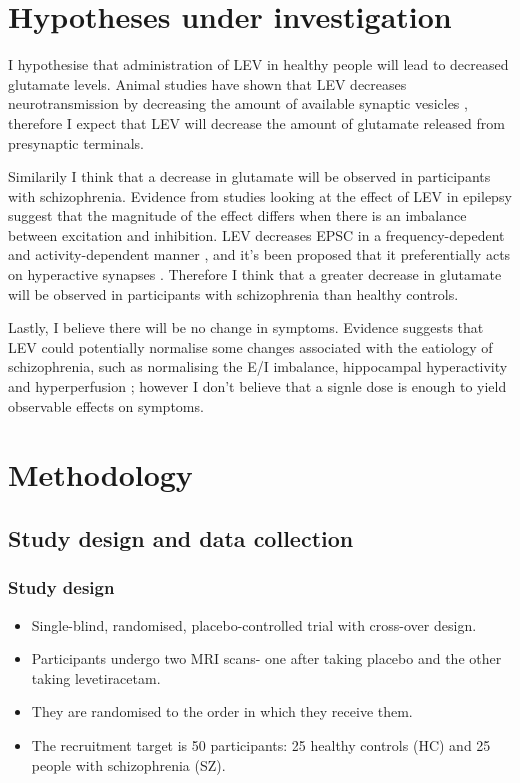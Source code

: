 \documentclass[
  letterpaper,
  DIV=11,
  numbers=noendperiod]{scrartcl}
\providecommand{\tightlist}{%
  \setlength{\itemsep}{0pt}\setlength{\parskip}{0pt}}\usepackage{longtable,booktabs,array}
\begin{document}
\section{Hypotheses under
investigation}\label{hypotheses-under-investigation}

I hypothesise that administration of LEV in healthy people will lead to
decreased glutamate levels. Animal studies have shown that LEV decreases
neurotransmission by decreasing the amount of available synaptic
vesicles \autocite{meehan_new_2011}, therefore I expect that LEV will
decrease the amount of glutamate released from presynaptic terminals.

Similarily I think that a decrease in glutamate will be observed in
participants with schizophrenia. Evidence from studies looking at the
effect of LEV in epilepsy suggest that the magnitude of the effect
differs when there is an imbalance between excitation and inhibition.
LEV decreases EPSC in a frequency-depedent and activity-dependent manner
\autocite{meehan_levetiracetam_2012}, and it's been proposed that it
preferentially acts on hyperactive synapses
\autocite{meehan_new_2011,loscher_synaptic_2016}. Therefore I think that
a greater decrease in glutamate will be observed in participants with
schizophrenia than healthy controls.

Lastly, I believe there will be no change in symptoms. Evidence suggests
that LEV could potentially normalise some changes associated with the
eatiology of schizophrenia, such as normalising the E/I imbalance,
hippocampal hyperactivity \autocite{roeske_modulation_2023} and
hyperperfusion \autocite{goff_levetiracetam_2020}; however I don't
believe that a signle dose is enough to yield observable effects on
symptoms.

\section{Methodology}\label{methodology}

\subsection{Study design and data
collection}\label{study-design-and-data-collection}

\subsubsection{Study design}\label{study-design}

\begin{itemize}
\tightlist
\item
  Single-blind, randomised, placebo-controlled trial with cross-over
  design.
\item
  Participants undergo two MRI scans- one after taking placebo and the
  other taking levetiracetam.
\item
  They are randomised to the order in which they receive them.
\item
  The recruitment target is 50 participants: 25 healthy controls (HC)
  and 25 people with schizophrenia (SZ).
\end{itemize}
\end{document}
